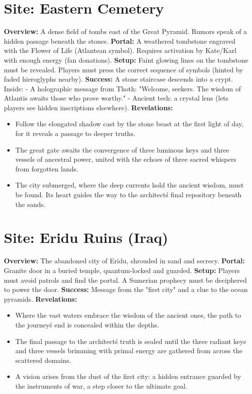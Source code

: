 \documentclass[12pt]{article}
\begin{document}
\section*{Site: Eastern Cemetery}
\textbf{Overview:}
A dense field of tombs east of the Great Pyramid. Rumors speak of a hidden passage beneath the stones.
\textbf{Portal:}
A weathered tombstone engraved with the Flower of Life (Atlantean symbol). Requires activation by Kate/Karl with enough energy (fan donations).
\textbf{Setup:}
Faint glowing lines on the tombstone must be revealed. Players must press the correct sequence of symbols (hinted by faded hieroglyphs nearby).
\textbf{Success:}
A stone staircase descends into a crypt. Inside:
- A holographic message from Thoth: "Welcome, seekers. The wisdom of Atlantis awaits those who prove worthy."
- Ancient tech: a crystal lens (lets players see hidden inscriptions elsewhere).
\textbf{Revelations:}
\begin{itemize}
  \item Follow the elongated shadow cast by the stone beast at the first light of day, for it reveals a passage to deeper truths.
  \item The great gate awaits the convergence of three luminous keys and three vessels of ancestral power, united with the echoes of three sacred whispers from forgotten lands.
  \item The city submerged, where the deep currents hold the ancient wisdom, must be found. Its heart guides the way to the architect\'s final repository beneath the sands.
\end{itemize}

\hrulefill

\section*{Site: Eridu Ruins (Iraq)}
\textbf{Overview:}
The abandoned city of Eridu, shrouded in sand and secrecy.
\textbf{Portal:}
Granite door in a buried temple, quantum-locked and guarded.
\textbf{Setup:}
Players must avoid patrols and find the portal. A Sumerian prophecy must be deciphered to power the door.
\textbf{Success:}
Message from the "first city" and a clue to the ocean pyramids.
\textbf{Revelations:}
\begin{itemize}
  \item Where the vast waters embrace the wisdom of the ancient ones, the path to the journey\'s end is concealed within the depths.
  \item The final passage to the architect\'s truth is sealed until the three radiant keys and three vessels brimming with primal energy are gathered from across the scattered domains.
  \item A vision arises from the dust of the first city: a hidden entrance guarded by the instruments of war, a step closer to the ultimate goal.
\end{itemize}
\end{document}
